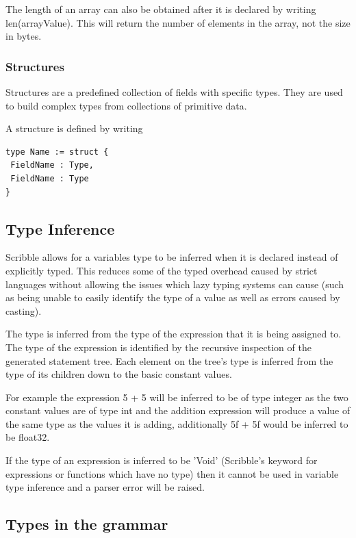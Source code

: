 \documentclass[]{final_report}
\begin{document}
The length of an array can also be obtained after it is declared by writing len(arrayValue). This will return the number of elements in the array, not the size in bytes.

\subsubsection{Structures}

Structures are a predefined collection of fields with specific types. They are used to build complex types from collections of primitive data.

A structure is defined by writing
\begin{verbatim}
type Name := struct {
 FieldName : Type,
 FieldName : Type
}
\end{verbatim}

\subsection{Type Inference}

Scribble allows for a variables type to be inferred when it is declared instead of explicitly typed. This reduces some of the typed overhead caused by strict languages without allowing the issues which lazy typing systems can cause (such as being unable to easily identify the type of a value as well as errors caused by casting).

The type is inferred from the type of the expression that it is being assigned to. The type of the expression is identified by the recursive inspection of the generated statement tree. Each element on the tree's type is inferred from the type of its children down to the basic constant values.

For example the expression 5 + 5 will be inferred to be of type integer as the two constant values are of type int and the addition expression will produce a value of the same type as the values it is adding, additionally 5f + 5f would be inferred to be float32.

If the type of an expression is inferred to be 'Void' (Scribble's keyword for expressions or functions which have no type) then it cannot be used in variable type inference and a parser error will be raised.

\subsection{Types in the grammar}
\end{document}
